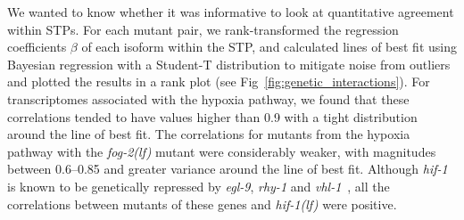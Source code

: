 \documentclass[9pt,twocolumn,twoside,lineno]{pnas-new}
\newcommand{\gene}[1]{\emph{#1}}
\newcommand{\fog}{\emph{\mbox{fog-2(lf)}}}
\newcommand{\egl}{\emph{\mbox{egl-9}(lf)}}
\newcommand{\rhy}{\emph{\mbox{rhy-1}(lf)}}
\newcommand{\hif}{\emph{\mbox{hif-1(lf)}}}
\newcommand{\egln}{2,549}
\newcommand{\rhyn}{3,005}
\begin{document}
We wanted to know whether it was informative to look at quantitative agreement
within STPs. For each mutant pair, we rank-transformed the regression
coefficients $\beta$ of each isoform within the STP, and calculated lines of best
fit using Bayesian regression with a Student-T distribution to mitigate noise
from outliers and plotted the results in a rank plot (see
Fig~\ref{fig:genetic_interactions}). For transcriptomes associated with the
hypoxia pathway, we found that these correlations tended to have values higher
than 0.9 with a tight distribution around the line of best fit. The correlations
for mutants from the hypoxia pathway with the \fog{} mutant were considerably
weaker, with magnitudes between 0.6--0.85 and greater variance around the line
of best fit. Although \gene{hif-1} is known to be genetically repressed by
\gene{egl-9}, \gene{rhy-1} and \gene{vhl-1}~\cite{Epstein2001,Shen2006}, all
the correlations between mutants of these genes and \hif{} were positive.

%
%
\end{document}
